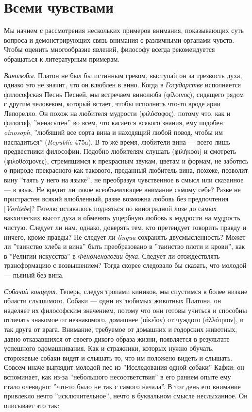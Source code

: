 \documentclass[12pt]{book}
\begin{document}
\section{Всеми чувствами}

Мы начнем с рассмотрения нескольких примеров внимания, показывающих суть вопроса и демонстрирующих связь внимания с различными органами чувств. Чтобы оценить многообразие явлений, философу всегда рекомендуется обращаться к литературным примерам.

\textit{Винолюбы}. Платон не был бы истинным греком, выступай он за трезвость духа, однако это не значит, что он влюблен в вино. Когда в \textit{Государстве} исполняется философская Песнь Песней, мы встречаем винолюба (φίλοινος), сидящего рядом с другим человеком, который встает, чтобы исполнить что-то вроде арии Лепорелло. Он похож на любителя мудрости (φιλόσοφος), потому что, как и философ, ''ненасытен'' во всем, что касается всякого знания, ему подобен \textit{oinosoph}, ''любящий все сорта вина и находящий любой повод, чтобы им насладиться'' (\textit{Republic} 475a). В то же время, любители вина --- всего лишь предвестники философии. Подобно любителям слушать (φιλήκοοι) и смотреть (φιλοθεάμονες), стремящимся к прекрасным звукам, цветам и формам, не заботясь о природе прекрасного как такового, преданный любитель вина, похоже, позволит вину ''таять у него на языке'', не преобразуя чувственное в смысл или сказанное --- в язык. Не вредит ли такое всеобъемлющее внимание самому себе? Разве не пристрастен всякий влюбленный, разве возможна любовь без предпочтения [\textit{Vorliebe}]? Гегелю оставалось подняться по виноградной лозе до самых вакхических высот духа и обменять ущербную любовь к мудрости на мудрость чистую. Следует ли нам, однако, доверять тем, кто претендует говорить правду и ничего, кроме правды? Не следует ли \textit{lingua} сохранять двусмысленность? Может ли ''таинство хлеба и вина'' быть преобразовано в ''таинство плоти и крови'', как в ''Религии искусства'' в \textit{Феноменологии духа}. Следует ли отождествлять трансформацию с возвышением? Тогда скорее следовало бы сказать, что молодой --- пьяный без вина.

\textit{Собачий концерт}. Теперь, следуя тропами киников, мы спустимся в более низкие области слышимого. Собаки --- одни из любимых животных Платона, он наделяет их философским значением, потому что они готовы учиться и способны отличать знакомое от незнакомого, домашнее (οίκεϊον) от чуждого (άλλότριον), и так друга от врага. Внимание, требуемое от домашних и годорских животных, давно отказавшихся от своего дикого образа жизни, появляется в результате успешного одомашнивания. Как и стражники, которых нужно обучать, сторожевые собаки видят и слышать то, что им положено видеть и слышать. Совсем иначе выглядит молодой пес из ''Исследования одной собаки'' Кафки: он вспоминает, как из-за ''небольшого несоответствия'' в его раннем опыте ему стало очевидно: ''что-то было не так с самого начала''. В тот день его внимание привлекло нечто ''исключительное'', нечто в буквальном смысле неслыханное. Он описывает это так:
\end{document}
